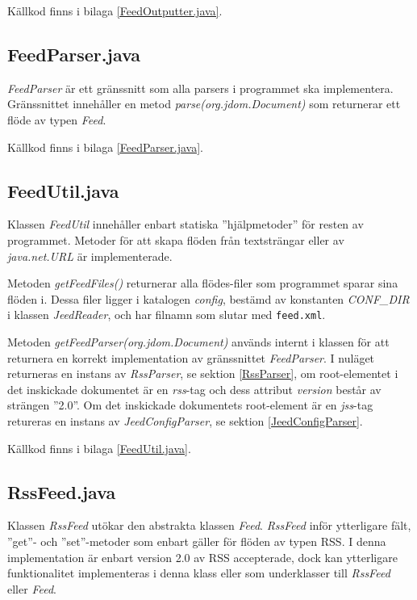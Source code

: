 \documentclass[a4paper, 12pt]{article}
\begin{document}
Källkod finns i bilaga \ref{FeedOutputter.java}.

\subsection{FeedParser.java}\label{FeedParser}
\textit{FeedParser} är ett gränssnitt som alla parsers i programmet
ska implementera. Gränssnittet innehåller en metod
\textit{parse(org.jdom.Document)} som returnerar ett flöde av typen
\textit{Feed}.

Källkod finns i bilaga \ref{FeedParser.java}.

\subsection{FeedUtil.java}\label{FeedUtil}
Klassen \textit{FeedUtil} innehåller enbart statiska
''hjälp\-metoder'' för resten av programmet. Metoder för att skapa
flöden från textsträngar eller av \textit{java.net.URL} är
implementerade.

Metoden \textit{getFeedFiles()}\label{getFeedFiles()} returnerar alla
flödes-filer som programmet sparar sina flöden i. Dessa filer ligger i
katalogen \textit{config}, bestämd av konstanten \textit{CONF\_DIR} i
klassen \textit{JeedReader}, och har filnamn som slutar med
\verb!feed.xml!.

Metoden \textit{getFeedParser(org.jdom.Document)} används internt i
klassen för att returnera en korrekt implementation av gränssnittet
\textit{FeedParser}. I nuläget returneras en instans av
\textit{RssParser}, se sektion \ref{RssParser}, om root-elementet i
det inskickade dokumentet är en \textit{rss}-tag och dess attribut
\textit{version} består av strängen ''2.0''. Om det inskickade
dokumentets root-element är en \textit{jss}-tag retureras en instans
av \textit{JeedConfigParser}, se sektion \ref{JeedConfigParser}.

Källkod finns i bilaga \ref{FeedUtil.java}.

\subsection{RssFeed.java}\label{RssFeed}
Klassen \textit{RssFeed} utökar den abstrakta klassen
\textit{Feed}. \textit{RssFeed} inför ytterligare fält, ''get''- och
''set''-metoder som enbart gäller för flöden av typen RSS. I denna
implementation är enbart version 2.0 av RSS accepterade, dock kan
ytterligare funktionalitet implementeras i denna klass eller som
underklasser till \textit{RssFeed} eller \textit{Feed}.
\end{document}
